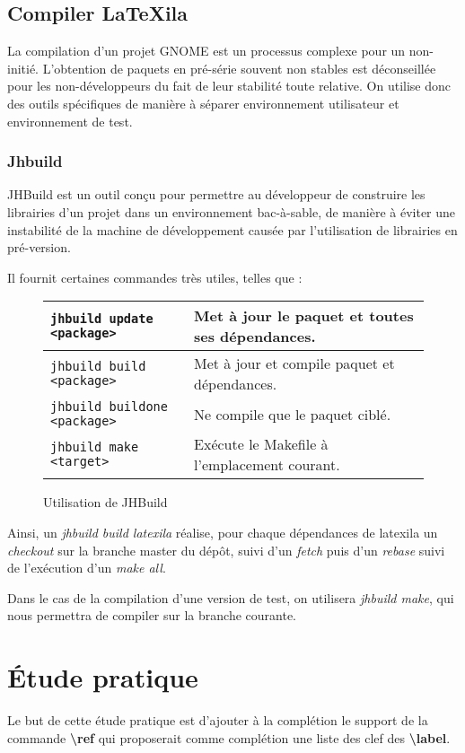 \documentclass[a4paper,11pt]{report}
\begin{document}
\section{Compiler LaTeXila}
\label{cha:compiler}
La compilation d'un projet GNOME est un processus complexe pour un non-initié.
L'obtention de paquets en pré-série souvent non stables est déconseillée pour les non-développeurs du fait de leur stabilité toute relative.
On utilise donc des outils spécifiques de manière à séparer environnement utilisateur et environnement de test. 

\subsection{Jhbuild}
\label{sub:jhbuild}
JHBuild est un outil conçu pour permettre au développeur de construire les librairies d'un projet dans un environnement bac-à-sable, de manière à éviter une instabilité de la machine de développement causée par l'utilisation de librairies en pré-version.

Il fournit certaines commandes très utiles, telles que :

\begin{figure}[h]
\begin{tabular}{|l|l|}
  \hline \texttt{jhbuild update <package>} & Met à jour le paquet et toutes ses dépendances. \\
  \hline \texttt{jhbuild build <package>} & Met à jour et compile paquet et dépendances. \\
  \hline \texttt{jhbuild buildone <package>} & Ne compile que le paquet ciblé. \\
  \hline \texttt{jhbuild make <target>} & Exécute le Makefile à l'emplacement courant. \\
  \hline
\end{tabular}
\caption{Utilisation de JHBuild}
\end{figure}

Ainsi, un \textit{jhbuild build latexila} réalise, pour chaque dépendances de latexila un \textit{checkout} sur la branche master du dépôt, suivi d'un \textit{fetch} puis d'un \textit{rebase} suivi de l'exécution d'un \textit{make all}.

Dans le cas de la compilation d'une version de test, on utilisera \textit{jhbuild make}, qui nous permettra de compiler sur la branche courante.

\chapter{Étude pratique} %
\label{cha:etude_pratique}
Le but de cette étude pratique est d'ajouter à la complétion le support de la commande \textbf{\textbackslash{}ref} qui proposerait comme complétion une liste des clef des \textbf{\textbackslash{}label}.
\end{document}
